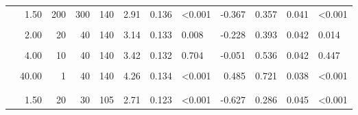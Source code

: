 \documentclass[
]{article}
\begin{document}
\begin{longtable}[t]{lrrrrrrlrrrl}
\hspace{1em} & 1.50 & 200 & 300 & 140 & 2.91 & 0.136 & <0.001 & -0.367 & 0.357 & 0.041 & <0.001\\
\hspace{1em}\cellcolor{gray!10}{} & \cellcolor{gray!10}{2.00} & \cellcolor{gray!10}{2} & \cellcolor{gray!10}{4} & \cellcolor{gray!10}{140} & \cellcolor{gray!10}{3.04} & \cellcolor{gray!10}{0.138} & \cellcolor{gray!10}{0.002} & \cellcolor{gray!10}{-0.282} & \cellcolor{gray!10}{0.443} & \cellcolor{gray!10}{0.042} & \cellcolor{gray!10}{0.205}\\
\hspace{1em} & 2.00 & 20 & 40 & 140 & 3.14 & 0.133 & 0.008 & -0.228 & 0.393 & 0.042 & 0.014\\
\hspace{1em}\cellcolor{gray!10}{} & \cellcolor{gray!10}{2.00} & \cellcolor{gray!10}{200} & \cellcolor{gray!10}{400} & \cellcolor{gray!10}{140} & \cellcolor{gray!10}{3.07} & \cellcolor{gray!10}{0.134} & \cellcolor{gray!10}{0.002} & \cellcolor{gray!10}{-0.272} & \cellcolor{gray!10}{0.421} & \cellcolor{gray!10}{0.042} & \cellcolor{gray!10}{0.076}\\
\hspace{1em} & 4.00 & 10 & 40 & 140 & 3.42 & 0.132 & 0.704 & -0.051 & 0.536 & 0.042 & 0.447\\
\hspace{1em}\cellcolor{gray!10}{} & \cellcolor{gray!10}{20.00} & \cellcolor{gray!10}{2} & \cellcolor{gray!10}{40} & \cellcolor{gray!10}{140} & \cellcolor{gray!10}{4.19} & \cellcolor{gray!10}{0.127} & \cellcolor{gray!10}{<0.001} & \cellcolor{gray!10}{0.457} & \cellcolor{gray!10}{0.729} & \cellcolor{gray!10}{0.038} & \cellcolor{gray!10}{<0.001}\\
\hspace{1em} & 40.00 & 1 & 40 & 140 & 4.26 & 0.134 & <0.001 & 0.485 & 0.721 & 0.038 & <0.001\\
\addlinespace[0.3em]
\multicolumn{12}{l}{\textbf{Exp. 1b}}\\
\hspace{1em}\cellcolor{gray!10}{} & \cellcolor{gray!10}{1.33} & \cellcolor{gray!10}{300} & \cellcolor{gray!10}{400} & \cellcolor{gray!10}{105} & \cellcolor{gray!10}{2.60} & \cellcolor{gray!10}{0.133} & \cellcolor{gray!10}{<0.001} & \cellcolor{gray!10}{-0.664} & \cellcolor{gray!10}{0.305} & \cellcolor{gray!10}{0.045} & \cellcolor{gray!10}{<0.001}\\
\hspace{1em} & 1.50 & 20 & 30 & 105 & 2.71 & 0.123 & <0.001 & -0.627 & 0.286 & 0.045 & <0.001\\

\end{longtable}
\end{document}
